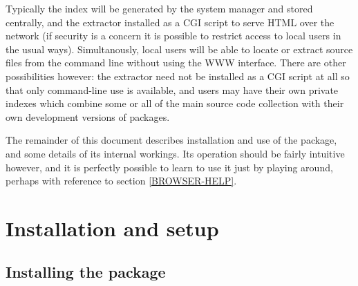 \documentclass[twoside,11pt]{article}
\newcommand{\xlabel}[1]{}
\renewcommand{\_}{\texttt{\symbol{95}}}
\begin{document}
Typically the index
will be generated by the system manager and stored centrally,
and the extractor installed
as a CGI script to serve HTML over the network (if security is
a concern it is possible to restrict access to local users in the
usual ways).  Simultanously, local users will be able to locate
or extract source files from the command line without using the
WWW interface.
There are other possibilities however: the extractor need not be
installed as a CGI script at all so that only command-line use
is available, and users may have their own private indexes
which combine some or all of the main source code collection
with their own development versions of packages.

The remainder of this document describes installation and use of
the package, and some details of its internal workings.
Its operation should be fairly intuitive however,
and it is perfectly possible to learn to use it just by playing around,
perhaps with reference to section \ref{BROWSER-HELP}.




\section{\xlabel{sec:install}\label{sec:install}Installation and setup}

\subsection{\xlabel{sec:install-pack}\label{sec:install-pack}Installing the package}
\end{document}
